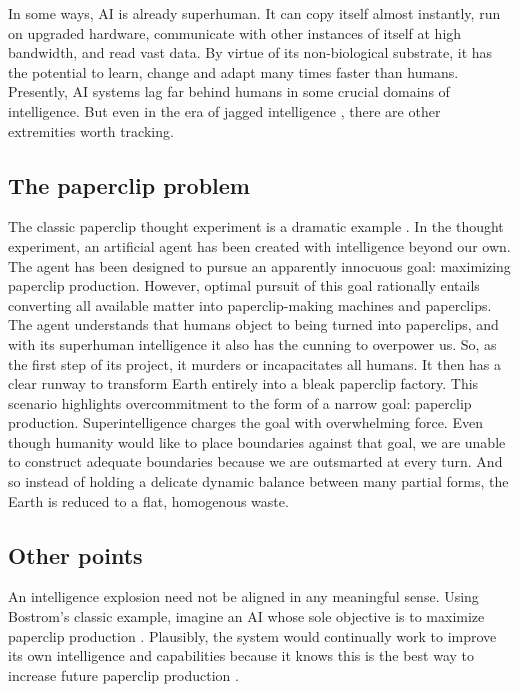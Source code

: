 In some ways, AI is already superhuman. It can copy itself almost instantly, run on upgraded hardware, communicate with other instances of itself at high bandwidth, and read vast data. By virtue of its non-biological substrate, it has the potential to learn, change and adapt many times faster than humans. Presently, AI systems lag far behind humans in some crucial domains of intelligence. But even in the era of jagged intelligence \citep{karpathy2024jagged}, there are other extremities worth tracking. 

\subsection{The paperclip problem}

The classic paperclip thought experiment is a dramatic example \citep{bostrom2003ethical, bostrom2014superintelligence}. In the thought experiment, an artificial agent has been created with intelligence beyond our own. The agent has been designed to pursue an apparently innocuous goal: maximizing paperclip production. However, optimal pursuit of this goal rationally entails converting all available matter into paperclip-making machines and paperclips. The agent understands that humans object to being turned into paperclips, and with its superhuman intelligence it also has the cunning to overpower us. So, as the first step of its project, it murders or incapacitates all humans. It then has a clear runway to transform Earth entirely into a bleak paperclip factory. This scenario highlights overcommitment to the form of a narrow goal: paperclip production. Superintelligence charges the goal with overwhelming force. Even though humanity would like to place boundaries against that goal, we are unable to construct adequate boundaries because we are outsmarted at every turn. And so instead of holding a delicate dynamic balance between many partial forms, the Earth is reduced to a flat, homogenous waste.

\subsection{Other points}

An intelligence explosion need not be aligned in any meaningful sense. Using Bostrom's classic example, imagine an AI whose sole objective is to maximize paperclip production \citep{bostrom2014superintelligence}. Plausibly, the system would continually work to improve its own intelligence and capabilities because it knows this is the best way to increase future paperclip production \citep{silver2021reward, bostrom2012superintelligent}.

